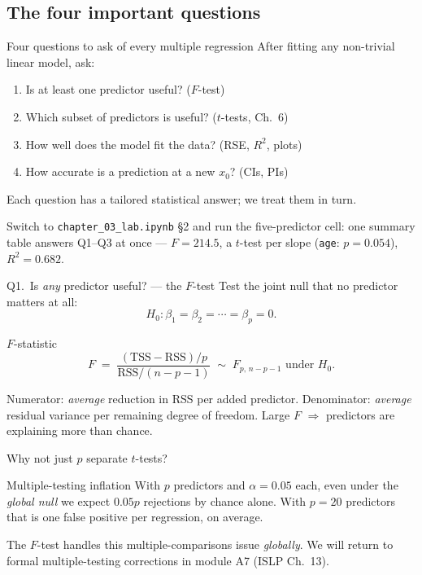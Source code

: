 \documentclass[aspectratio=169,11pt]{beamer}
\begin{document}
\subsection{The four important questions}

\begin{frame}{Four questions to ask of every multiple regression}
  After fitting any non-trivial linear model, ask:
  \begin{enumerate}
    \item Is at least one predictor useful? \hfill ($F$-test)
    \item Which subset of predictors is useful? \hfill ($t$-tests, Ch.~6)
    \item How well does the model fit the data? \hfill (RSE, $R^2$, plots)
    \item How accurate is a prediction at a new $x_0$? \hfill (CIs, PIs)
  \end{enumerate}
  Each question has a tailored statistical answer; we treat them in
  turn.
  \begin{labnote}
    Switch to \texttt{chapter\_03\_lab.ipynb} \S2 and run the five-predictor
    cell: one summary table answers Q1--Q3 at once --- $F=214.5$, a $t$-test
    per slope (\texttt{age}: $p=0.054$), $R^2=0.682$.
  \end{labnote}
\end{frame}

\begin{frame}{Q1.\ Is \emph{any} predictor useful? --- the $F$-test}
  Test the joint null that no predictor matters at all:
  \[
    H_0: \beta_1 = \beta_2 = \cdots = \beta_p = 0.
  \]
  \begin{block}{$F$-statistic}
    \[
      F \;=\; \frac{(\mathrm{TSS} - \mathrm{RSS})/p}
                   {\mathrm{RSS}/(n - p - 1)}
            \;\sim\; F_{p,\,n-p-1} \text{ under } H_0.
    \]
  \end{block}
  \begin{readme}
    Numerator: \emph{average} reduction in RSS per added predictor.
    Denominator: \emph{average} residual variance per remaining degree
    of freedom. Large $F$ $\Rightarrow$ predictors are explaining more
    than chance.
  \end{readme}
\end{frame}

\begin{frame}{Why not just $p$ separate $t$-tests?}
  \begin{alertblock}{Multiple-testing inflation}
    With $p$ predictors and $\alpha = 0.05$ each, even under the
    \emph{global null} we expect $0.05 p$ rejections by chance alone.
    With $p = 20$ predictors that is one false positive per
    regression, on average.
  \end{alertblock}
  \begin{takeaway}
    The $F$-test handles this multiple-comparisons issue
    \emph{globally}. We will return to formal multiple-testing
    corrections in module A7 (ISLP Ch.\ 13).
  \end{takeaway}
\end{frame}
\end{document}
